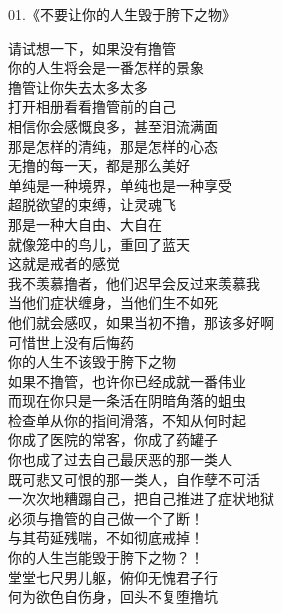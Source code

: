 \begin{center}
    01.《不要让你的人生毁于胯下之物》\it
    \begin{multicols}{2}
        请试想一下，如果没有撸管 \\ 你的人生将会是一番怎样的景象 \\ 撸管让你失去太多太多 \\ 打开相册看看撸管前的自己 \\ 相信你会感慨良多，甚至泪流满面 \\ 那是怎样的清纯，那是怎样的心态 \\ 无撸的每一天，都是那么美好 \\ 单纯是一种境界，单纯也是一种享受 \\ 超脱欲望的束缚，让灵魂飞 \\ 那是一种大自由、大自在 \\ 就像笼中的鸟儿，重回了蓝天 \\ 这就是戒者的感觉 \\ 我不羡慕撸者，他们迟早会反过来羡慕我 \\ 当他们症状缠身，当他们生不如死 \\ 他们就会感叹，如果当初不撸，那该多好啊 \\ 可惜世上没有后悔药 \\ 你的人生不该毁于胯下之物 \\ 如果不撸管，也许你已经成就一番伟业 \\ 而现在你只是一条活在阴暗角落的蛆虫 \\ 检查单从你的指间滑落，不知从何时起 \\ 你成了医院的常客，你成了药罐子 \\ 你也成了过去自己最厌恶的那一类人 \\ 既可悲又可恨的那一类人，自作孽不可活 \\ 一次次地糟蹋自己，把自己推进了症状地狱 \\ 必须与撸管的自己做一个了断！ \\ 与其苟延残喘，不如彻底戒掉！ \\ 你的人生岂能毁于胯下之物？！ \\ 堂堂七尺男儿躯，俯仰无愧君子行 \\ 何为欲色自伤身，回头不复堕撸坑
    \end{multicols}
\end{center}

